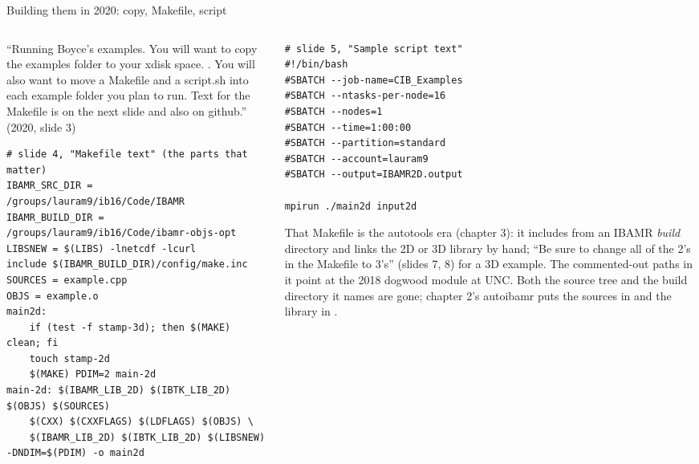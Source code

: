 \documentclass[aspectratio=169,11pt]{beamer}
\begin{document}
\begin{frame}[fragile]{Building them in 2020: copy, Makefile, script}
\label{fr:build2020}
\begin{columns}[T,onlytextwidth]
\begin{column}{0.5\textwidth}
\footnotesize ``Running Boyce's examples. You will want to copy the examples folder to your xdisk space.   . You will also want to move a Makefile and a script.sh into each example folder you plan to run. Text for the Makefile is on the next slide and also on github.'' (2020, slide 3)
\begin{lstlisting}[style=shelltiny]
# slide 4, "Makefile text" (the parts that matter)
IBAMR_SRC_DIR = /groups/lauram9/ib16/Code/IBAMR
IBAMR_BUILD_DIR = /groups/lauram9/ib16/Code/ibamr-objs-opt
LIBSNEW = $(LIBS) -lnetcdf -lcurl
include $(IBAMR_BUILD_DIR)/config/make.inc
SOURCES = example.cpp
OBJS = example.o
main2d:
	if (test -f stamp-3d); then $(MAKE) clean; fi
	touch stamp-2d
	$(MAKE) PDIM=2 main-2d
main-2d: $(IBAMR_LIB_2D) $(IBTK_LIB_2D) $(OBJS) $(SOURCES)
	$(CXX) $(CXXFLAGS) $(LDFLAGS) $(OBJS) \
	$(IBAMR_LIB_2D) $(IBTK_LIB_2D) $(LIBSNEW) -DNDIM=$(PDIM) -o main2d
\end{lstlisting}
\end{column}
\begin{column}{0.48\textwidth}
\begin{lstlisting}[style=shelltiny]
# slide 5, "Sample script text"
#!/bin/bash
#SBATCH --job-name=CIB_Examples
#SBATCH --ntasks-per-node=16
#SBATCH --nodes=1
#SBATCH --time=1:00:00
#SBATCH --partition=standard
#SBATCH --account=lauram9
#SBATCH --output=IBAMR2D.output

mpirun ./main2d input2d
\end{lstlisting}
\scriptsize That Makefile is the autotools era (chapter 3): it includes  from an IBAMR \emph{build} directory and links the 2D or 3D library by hand; ``Be sure to change all of the 2's in the Makefile to 3's'' (slides 7, 8) for a 3D example. The commented-out paths in it point at the 2018 dogwood module at UNC. Both the source tree and the build directory it names are gone; chapter 2's autoibamr puts the sources in  and the library in .
\end{column}
\end{columns}
\end{frame}
\end{document}
